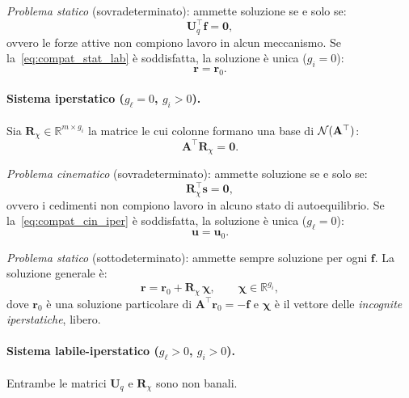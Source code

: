 \noindent\emph{Problema statico} (sovradeterminato):
ammette soluzione se e solo se:
\begin{equation}\label{eq:compat_stat_lab}
	\bm{U}_q^{\top}\bm{f} = \bm{0},
\end{equation}
ovvero le forze attive non compiono lavoro in alcun
meccanismo. Se la~\eqref{eq:compat_stat_lab} è soddisfatta,
la soluzione è unica ($g_i = 0$):
\begin{equation}\label{eq:sol_lab_stat}
	\bm{r} = \bm{r}_0.
\end{equation}

\paragraph{Sistema iperstatico ($g_\ell = 0$,
	$g_i > 0$).}
Sia $\bm{R}_\chi \in \mathbb{R}^{m \times g_i}$
la matrice le cui colonne formano una base di
$\mathcal{N}(\mathbf{A}^{\top})$:
\begin{equation}\label{eq:ker_AT_iper}
	\bm{A}^{\top}\bm{R}_\chi = \bm{0}.
\end{equation}

\noindent\emph{Problema cinematico} (sovradeterminato):
ammette soluzione se e solo se:
\begin{equation}\label{eq:compat_cin_iper}
	\bm{R}_\chi^{\top}\bm{s} = \bm{0},
\end{equation}
ovvero i cedimenti non compiono lavoro in alcuno stato
di autoequilibrio. Se la~\eqref{eq:compat_cin_iper} è
soddisfatta, la soluzione è unica ($g_\ell = 0$):
\begin{equation}\label{eq:sol_iper_cin}
	\bm{u} = \bm{u}_0.
\end{equation}

\noindent\emph{Problema statico} (sottodeterminato):
ammette sempre soluzione per ogni $\bm{f}$. La soluzione
generale è:
\begin{equation}\label{eq:sol_iper_stat}
	\bm{r} = \bm{r}_0 + \bm{R}_\chi\,\bm{\chi},
	\qquad \bm{\chi} \in \mathbb{R}^{g_i},
\end{equation}
dove $\bm{r}_0$ è una soluzione particolare di
$\bm{A}^{\top}\bm{r}_0 = -\bm{f}$ e $\bm{\chi}$ è il
vettore delle \emph{incognite iperstatiche}, libero.

\paragraph{Sistema labile-iperstatico ($g_\ell > 0$,
	$g_i > 0$).}
Entrambe le matrici $\bm{U}_q$ e $\bm{R}_\chi$ sono non
banali.

